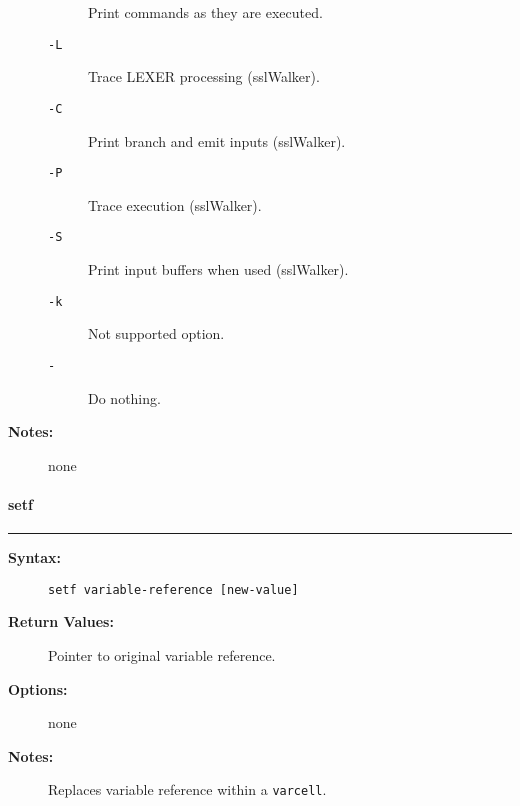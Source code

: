 \begin{description}
\begin{description}
Print commands as they are executed.

\item[{\tt -L}] \mbox{}

Trace LEXER processing (sslWalker).

\item[{\tt -C}] \mbox{}

Print branch and emit inputs (sslWalker).

\item[{\tt -P}] \mbox{}

Trace execution (sslWalker).

\item[{\tt -S}] \mbox{}

Print input buffers when used (sslWalker). 

\item[{\tt -k}] \mbox{}

Not supported option.

\item[{\tt -}] \mbox{}

Do nothing.

\end{description}


\item[{\bf Notes:}] \mbox{}

none  

\end{description}


\vspace {2pt}


\paragraph{setf}

\hrule
\begin{description}
\item[{\bf Syntax:}] \mbox{}

{\tt setf variable-reference [new-value]}

\item[{\bf Return Values:}] \mbox{}

Pointer to original variable reference.

\item[{\bf Options:}] \mbox{}

none  

\item[{\bf Notes:}] \mbox{}

Replaces variable reference within a {\tt varcell}.

\end{description}


